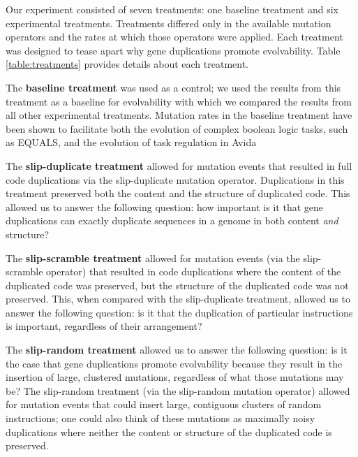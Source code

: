% 

Our experiment consisted of seven treatments: one baseline treatment and six experimental treatments. Treatments differed only in the available mutation operators and the rates at which those operators were applied. Each treatment was designed to tease apart why gene duplications promote evolvability. Table \ref{table:treatments} provides details about each treatment.

The \textbf{baseline treatment} was used as a control; we used the results from this treatment as a baseline for evolvability with which we compared the results from all other experimental treatments. Mutation rates in the baseline treatment have been shown to facilitate both the evolution of complex boolean logic tasks, such as EQUALS, and the evolution of task regulation in Avida \citep{lenski2003evolutionary, Lalejini:2016plasticity}

The \textbf{slip-duplicate treatment} allowed for mutation events that resulted in full code duplications via the slip-duplicate mutation operator. Duplications in this treatment preserved both the content and the structure of duplicated code. This allowed us to answer the following question: how important is it that gene duplications can exactly duplicate sequences in a genome in both content \textit{and} structure?

The \textbf{slip-scramble treatment} allowed for mutation events (via the slip-scramble operator) that resulted in code duplications where the content of the duplicated code was preserved, but the structure of the duplicated code was not preserved. This, when compared with the slip-duplicate treatment, allowed us to answer the following question: is it that the duplication of particular instructions is important, regardless of their arrangement?

The \textbf{slip-random treatment} allowed us to answer the following question: is it the case that gene duplications promote evolvability because they result in the insertion of large, clustered mutations, regardless of what those mutations may be? The slip-random treatment (via the slip-random mutation operator) allowed for mutation events that could insert large, contiguous clusters of random instructions; one could also think of these mutations as maximally noisy duplications where neither the content or structure of the duplicated code is preserved.

